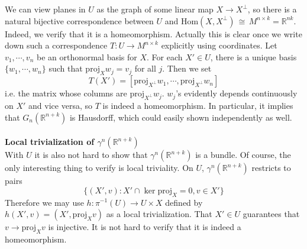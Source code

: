 \documentclass[12pt]{article}
\theoremstyle{plain}
\theoremstyle{definition}
\newcommand{\IR}{\mathbb{R}}
\newcommand{\Hom}{\mathrm{Hom}}
\newcommand\iso{\,{\cong}\,}
\newcommand{\<}{\langle}
\renewcommand{\>}{\rangle}
\newcommand{\tG}{G_n(\IR^{n + k})}
\newcommand{\proj}{\mathrm{proj}}
\begin{document}
We can view planes in $U$ as the graph of some linear map $X \to X^\perp$, so there is a natural bijective correspondence between $U$ and $\Hom(X, X^\perp) \iso M^{n \times k} = \IR^{nk}$. Indeed, we verify that it is a homeomorphism. Actually this is clear once we write down such a correspondence $T : U \to M^{n \times k}$ explicitly using coordinates. Let $v_1, \cdots, v_n$ be an orthonormal basis for $X$. For each $X' \in U$, there is a unique basis $\{w_1, \cdots, w_n\}$ such that $\proj_X w_j = v_j$ for all $j$. Then we set $$T(X') = [ \proj_{X^\perp} w_1, \cdots, \proj_{X^\perp} w_n ]$$ i.e. the matrix whose columns are $\proj_{X^\perp} w_j$. $w_j$'s evidently depends continuously on $X'$ and vice versa, so $T$ is indeed a homeomorphism. In particular, it implies that $\tG$ is Hausdorff, which could easily shown independently as well. \\\\
\textbf{Local trivialization of $\gamma^n(\IR^{n+k})$}\\
With $U$ it is also not hard to show that $\gamma^n(\IR^{n + k})$ is a bundle. Of course, the only interesting thing to verify is local triviality. On $U$, $\gamma^n(\IR^{n + k})$ restricts to pairs
$$ \{(X', v) : X' \cap \ker \proj_X = 0, v \in X'\}$$
Therefore we may use $h: \pi^{-1}(U) \to U \times X$ defined by $h(X', v) = (X', \proj_X v)$ as a local trivialization. That $X' \in U$ guarantees that $v \to \proj_X v$ is injective. It is not hard to verify that it is indeed a homeomorphism. 
\end{document}
